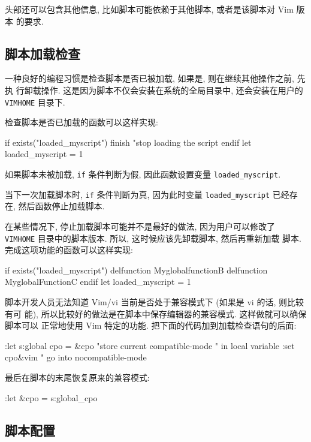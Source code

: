 头部还可以包含其他信息, 比如脚本可能依赖于其他脚本, 或者是该脚本对 Vim 版本
的要求.

\subsection{脚本加载检查}
\label{subsec:script_loaded_check}

一种良好的编程习惯是检查脚本是否已被加载, 如果是, 则在继续其他操作之前, 先执
行卸载操作.
这是因为脚本不仅会安装在系统的全局目录中, 还会安装在用户的
\texttt{VIMHOME} 目录下.

检查脚本是否已加载的函数可以这样实现:
\begin{vimcode}
if exists("loaded_myscript")
    finish "stop loading the script
endif
let loaded_myscript = 1
\end{vimcode}
如果脚本未被加载, \texttt{if} 条件判断为假, 因此函数设置变量
\texttt{loaded\_myscript}.

当下一次加载脚本时, \texttt{if} 条件判断为真, 因为此时变量
\texttt{loaded\_myscript} 已经存在, 然后函数停止加载脚本.

在某些情况下, 停止加载脚本可能并不是最好的做法, 因为用户可以修改了
\texttt{VIMHOME} 目录中的脚本版本. 所以, 这时候应该先卸载脚本, 然后再重新加载
脚本. 完成这项功能的函数可以这样实现:
\begin{vimcode}
if exists("loaded_myscript")
    delfunction MyglobalfunctionB
    delfunction MyglobalFunctionC
endif
let loaded_myscript = 1
\end{vimcode}

脚本开发人员无法知道 Vim/vi 当前是否处于兼容模式下 (如果是 vi 的话, 则比较有可
能), 所以比较好的做法是在脚本中保存编辑器的兼容模式. 这样做就可以确保脚本可以
正常地使用 Vim 特定的功能. 把下面的代码加到加载检查语句的后面:
\begin{vimcode}
:let s:global cpo = &cpo "store current compatible-mode
                         " in local variable
:set cpo&vim             " go into nocompatible-mode
\end{vimcode}
最后在脚本的末尾恢复原来的兼容模式:
\begin{vimcode}
:let &cpo = s:global_cpo
\end{vimcode}

\subsection{脚本配置}
\label{subsec:script_configuration}

